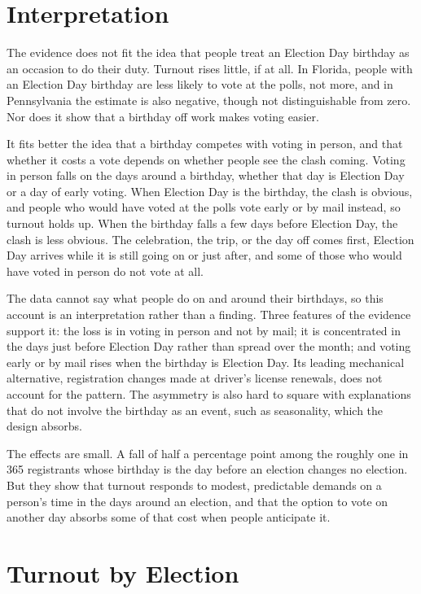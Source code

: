 \documentclass[11pt]{article}
\begin{document}
\section{Interpretation}

The evidence does not fit the idea that people treat an Election Day birthday as an occasion to do their duty. Turnout rises little, if at all. In Florida, people with an Election Day birthday are less likely to vote at the polls, not more, and in Pennsylvania the estimate is also negative, though not distinguishable from zero. Nor does it show that a birthday off work makes voting easier.

It fits better the idea that a birthday competes with voting in person, and that whether it costs a vote depends on whether people see the clash coming. Voting in person falls on the days around a birthday, whether that day is Election Day or a day of early voting. When Election Day is the birthday, the clash is obvious, and people who would have voted at the polls vote early or by mail instead, so turnout holds up. When the birthday falls a few days before Election Day, the clash is less obvious. The celebration, the trip, or the day off comes first, Election Day arrives while it is still going on or just after, and some of those who would have voted in person do not vote at all.

The data cannot say what people do on and around their birthdays, so this account is an interpretation rather than a finding. Three features of the evidence support it: the loss is in voting in person and not by mail; it is concentrated in the days just before Election Day rather than spread over the month; and voting early or by mail rises when the birthday is Election Day. Its leading mechanical alternative, registration changes made at driver's license renewals, does not account for the pattern. The asymmetry is also hard to square with explanations that do not involve the birthday as an event, such as seasonality, which the design absorbs.

The effects are small. A fall of half a percentage point among the roughly one in 365 registrants whose birthday is the day before an election changes no election. But they show that turnout responds to modest, predictable demands on a person's time in the days around an election, and that the option to vote on another day absorbs some of that cost when people anticipate it.




\clearpage
\appendix
\section{Turnout by Election}

\begingroup\small

\endgroup
\end{document}
